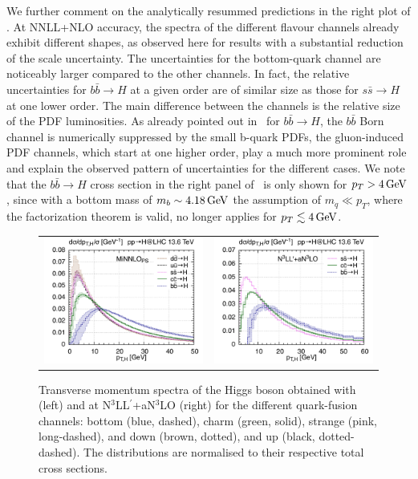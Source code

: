 \documentclass[11pt,a4paper]{article}
\begin{document}
We further comment on the analytically resummed predictions in the right
plot of .
At NNLL+NLO accuracy, the spectra of the different flavour channels already exhibit different shapes, as observed here for \nnnres{} results with a substantial reduction of the scale uncertainty. The uncertainties for the bottom-quark channel are noticeably larger compared to the other channels.
In fact, the relative uncertainties for $b\bar b \to H$ at
a given order are of similar size as those for $s\bar s \to H$ at one lower order.
The main difference between the channels is the relative size of the PDF luminosities.
As already pointed out in~ for $b\bar b \to H$, the $b\bar b$ Born channel is numerically suppressed by the small b-quark PDFs, the
gluon-induced PDF channels, which start at one higher order, play a much more prominent role and explain the observed pattern of uncertainties for the different cases. We note that the $b\bar b \to H$ cross section in the 
right panel of~ is only shown for $p_T> 4\, \mathrm{GeV}$,
since with a bottom mass of $m_b \sim 4.18\, \mathrm{GeV}$ the assumption of 
$m_q \ll p_T$, where the factorization theorem is valid, no longer applies 
for $p_T\lesssim 4\, \mathrm{GeV}$.

\begin{figure}[t!]
\begin{center}
\begin{tabular}{cc}
	\includegraphics[width=.45\textwidth, page=1]{plots/5fs/light/ptHzoom_qqH.pdf}&
	\includegraphics[width=.45\textwidth, page=1]{plots/5fs/light/ptHzoom_qqHres.pdf}
\end{tabular}
\vspace*{1ex}
\caption{Transverse momentum spectra of the Higgs boson obtained with \minnlo{} (left) and at N$^3$LL$^{\prime}$+aN$^3$LO (right) for the different quark-fusion channels: bottom (blue, dashed), charm (green, solid), strange (pink, long-dashed), and down (brown, dotted), and up (black, dotted-dashed). The distributions are 
normalised to their respective total cross sections.
\label{fig:lightpTHzoom}}
\end{center}
\end{figure}
\end{document}
